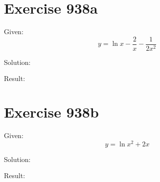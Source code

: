 \documentclass[a4paper, 10pt]{scrartcl}
\begin{document}
\section{Exercise 938a}

Given:
\[
y = \ln{x} - \frac{2}{x} - \frac{1}{2x^{2}}
\]

Solution:

Result:

\section{Exercise 938b}

Given:
\[
y = \ln{x^{2} + 2x}
\]

Solution:

Result:
\end{document}
